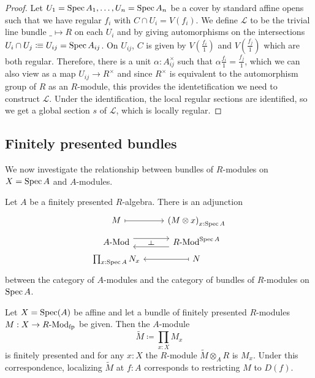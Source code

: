 \begin{proof}
  Let $U_1=\operatorname{Spec} A_1,\dots,U_n=\operatorname{Spec} A_n$ be a cover by standard  affine opens such that we have
  regular $f_i$ with $C\cap U_i=V(f_i)$. 
  We define $\mathcal L$ to be the trivial line bundle $\_\mapsto R$ on each $U_i$
  and by giving automorphisms on the intersections $U_i\cap U_j\vcentcolon\mspace{-1.2mu}\equiv U_{ij}=\operatorname{Spec} A_{ij}$.
  On $U_{ij}$, $C$ is given by $V(\frac{f_i}{1})$ and $V(\frac{f_j}{1})$ which are both regular.
  Therefore, there is a unit $\alpha:A_{ij}^\times$ such that $\alpha\frac{f_i}{1}=\frac{f_j}{1}$,
  which we can also view as a map $U_{ij}\to R^\times$ and since $R^\times$
  is equivalent to the automorphism group of $R$ as an $R$-module,
  this provides the identetification we need to construct $\mathcal L$.
  Under the identification, the local regular sections are identified, so we get a global section $s$ of $\mathcal L$,
  which is locally regular.
\end{proof}

\subsection{Finitely presented bundles}

We now investigate the relationship between bundles of $R$-modules on $X = \operatorname{Spec} A$
and $A$-modules.

\begin{proposition}
  Let $A$ be a finitely presented $R$-algebra.
  There is an adjunction
  \[ \begin{tikzcd}[row sep=tiny]
    M \ar[r, mapsto] & {(M \otimes x)}_{x : \Spec A} \\
    \Mod{A} \ar[r, shift left=2] \ar[r, phantom, "\rotatebox{90}{$\vdash$}"] &
    \Mod{R}^{\Spec A} \ar[l, shift left=2] \\
    \prod_{x : \Spec A} N_x & N \ar[l, mapsto]
  \end{tikzcd} \]
  between the category of $A$-modules
  and the category of bundles of $R$-modules on $\operatorname{Spec} A$.
\end{proposition}

\begin{theorem}%
  \label{thm:fp-module}
  Let $X=\operatorname{Spec}(A)$ be affine and
  let a bundle of finitely presented $R$-modules $M : X\to R\text{-}\mathrm{Mod}_{\text{fp}}$ be given.
  Then the $A$-module
  \[ \tilde{M}\coloneqq\prod_{x:X}M_x \]
  is finitely presented and for any $x:X$ the $R$-module $\tilde{M}\otimes_A R$ is $M_x$.
  Under this correspondence, localizing $\tilde{M}$ at $f:A$ corresponds to restricting $M$ to $D(f)$.
\end{theorem}

